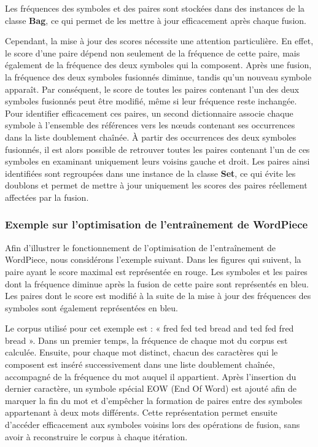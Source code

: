 \documentclass[12pt,a4paper]{report}
\begin{document}
	Les fréquences des symboles et des paires sont stockées dans des instances de la classe \textbf{Bag}, ce qui permet de les mettre à jour efficacement après chaque fusion.
	
	Cependant, la mise à jour des scores nécessite une attention particulière. En effet, le score d'une paire dépend non seulement de la fréquence de cette paire, mais également de la fréquence des deux symboles qui la composent. Après une fusion, la fréquence des deux symboles fusionnés diminue, tandis qu'un nouveau symbole apparaît. Par conséquent, le score de toutes les paires contenant l'un des deux symboles fusionnés peut être modifié, même si leur fréquence reste inchangée.
	Pour identifier efficacement ces paires, un second dictionnaire associe chaque symbole à l'ensemble des références vers les nœuds contenant ses occurrences dans la liste doublement chaînée. À partir des occurrences des deux symboles fusionnés, il est alors possible de retrouver toutes les paires contenant l'un de ces symboles en examinant uniquement leurs voisins gauche et droit. Les paires ainsi identifiées sont regroupées dans une instance de la classe \textbf{Set}, ce qui évite les doublons et permet de mettre à jour uniquement les scores des paires réellement affectées par la fusion.
	
	\subsubsection{Exemple sur l'optimisation de l'entraînement de WordPiece}
	
	Afin d'illustrer le fonctionnement de l'optimisation de l'entraînement de WordPiece, nous considérons l'exemple suivant. Dans les figures qui suivent, la paire ayant le score maximal est représentée en rouge. Les symboles et les paires dont la fréquence diminue après la fusion de cette paire sont représentés en bleu. Les paires dont le score est modifié à la suite de la mise à jour des fréquences des symboles sont également représentées en bleu.
	
	Le corpus utilisé pour cet exemple est : « fred fed ted bread and ted fed fred bread ». Dans un premier temps, la fréquence de chaque mot du corpus est calculée. Ensuite, pour chaque mot distinct, chacun des caractères qui le composent est inséré successivement dans une liste doublement chaînée, accompagné de la fréquence du mot auquel il appartient. Après l'insertion du dernier caractère, un symbole spécial EOW (End Of Word) est ajouté afin de marquer la fin du mot et d'empêcher la formation de paires entre des symboles appartenant à deux mots différents. Cette représentation permet ensuite d'accéder efficacement aux symboles voisins lors des opérations de fusion, sans avoir à reconstruire le corpus à chaque itération.
	
\end{document}
